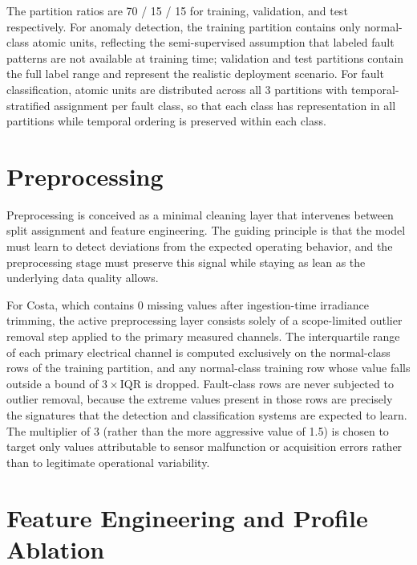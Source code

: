 The partition ratios are 70 / 15 / 15 for training, validation, and test respectively. For anomaly detection, the training partition contains only normal-class atomic units, reflecting the semi-supervised assumption that labeled fault patterns are not available at training time; validation and test partitions contain the full label range and represent the realistic deployment scenario. For fault classification, atomic units are distributed across all 3 partitions with temporal-stratified assignment per fault class, so that each class has representation in all partitions while temporal ordering is preserved within each class.

\section{Preprocessing}
\label{sec:preprocessing}

Preprocessing is conceived as a minimal cleaning layer that intervenes between split assignment and feature engineering. The guiding principle is that the model must learn to detect deviations from the expected operating behavior, and the preprocessing stage must preserve this signal while staying as lean as the underlying data quality allows.

For Costa, which contains 0 missing values after ingestion-time irradiance trimming, the active preprocessing layer consists solely of a scope-limited outlier removal step applied to the primary measured channels. The interquartile range of each primary electrical channel is computed exclusively on the normal-class rows of the training partition, and any normal-class training row whose value falls outside a bound of $3 \times \mathrm{IQR}$ is dropped. Fault-class rows are never subjected to outlier removal, because the extreme values present in those rows are precisely the signatures that the detection and classification systems are expected to learn. The multiplier of 3 (rather than the more aggressive value of 1.5) is chosen to target only values attributable to sensor malfunction or acquisition errors rather than to legitimate operational variability.

\section{Feature Engineering and Profile Ablation}
\label{sec:feature-engineering}

